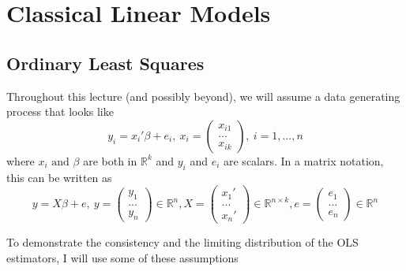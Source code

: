 \documentclass[12pt]{article}
\theoremstyle{definition}
\theoremstyle{property}
\theoremstyle{assumption}
\theoremstyle{example}
\theoremstyle{comment}
\begin{document}
\section{Classical Linear Models}
\subsection{Ordinary Least Squares}
Throughout this lecture (and possibly beyond), we will assume a data generating process that looks like
\[
y_i = x_i'\beta+e_i, \ x_i = \begin{pmatrix} x_{i1} \\ ... \\ x_{ik}\end{pmatrix}, \ i=1,...,n
\]
where $x_i\text{ and }\beta $ are both in $\mathbb{R}^k$ and $y_i$ and $e_i$ are scalars. In a matrix notation, this can be written as
\[
y=X\beta+e, \ y = \begin{pmatrix} y_{1} \\ ... \\ y_{n}\end{pmatrix}\in\mathbb{R}^n, X = \begin{pmatrix} x_{1}' \\ ... \\ x_{n}'\end{pmatrix} \in\mathbb{R}^{n\times k}, e = \begin{pmatrix} e_{1} \\ ... \\ e_{n}\end{pmatrix}\in\mathbb{R}^n
\]\par
To demonstrate the consistency and the limiting distribution of the OLS estimators, I will use some of these assumptions
\end{document}
